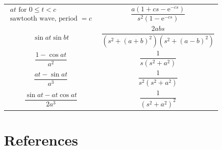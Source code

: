 \documentclass[
]{book}
\begin{document}
\begin{longtable}[]{@{}ll@{}}
\begin{minipage}[t]{0.42\columnwidth}
\[ \begin{align} at \text{ for } 0 \leq t \lt c \\ \text{sawtooth wave, period } = c \end{align}\]\strut
\end{minipage} & \begin{minipage}[t]{0.52\columnwidth}\raggedright
\[ \frac{a \left( 1 + cs - \mathrm{e}^{-cs} \right) }{s^2 \left( 1 - \mathrm{e}^{-cs} \right) } \]\strut
\end{minipage}\tabularnewline
\begin{minipage}[t]{0.42\columnwidth}\raggedright
\[\sin{at} \sin{bt} \]\strut
\end{minipage} & \begin{minipage}[t]{0.52\columnwidth}\raggedright
\[ \frac{2abs}{\left( s^2 + \left(a+b\right)^2\right) \left( s^2 + \left(a-b\right)^2\right)} \]\strut
\end{minipage}\tabularnewline
\begin{minipage}[t]{0.42\columnwidth}\raggedright
\[\frac{1 - \cos{at}}{a^2}  \]\strut
\end{minipage} & \begin{minipage}[t]{0.52\columnwidth}\raggedright
\[ \frac{1}{s \left( s^2 + a^2 \right) } \]\strut
\end{minipage}\tabularnewline
\begin{minipage}[t]{0.42\columnwidth}\raggedright
\[\frac{at - \sin{at}}{a^3}  \]\strut
\end{minipage} & \begin{minipage}[t]{0.52\columnwidth}\raggedright
\[ \frac{1}{s^2 \left( s^2 + a^2 \right) } \]\strut
\end{minipage}\tabularnewline
\begin{minipage}[t]{0.42\columnwidth}\raggedright
\[\frac{\sin{at} - at\cos{at}}{2a^3}  \]\strut
\end{minipage} & \begin{minipage}[t]{0.52\columnwidth}\raggedright
\[ \frac{1}{\left( s^2 + a^2 \right)^2 } \]\strut
\end{minipage}\tabularnewline
\bottomrule
\end{longtable}

\hypertarget{references}{%
\section{References}\label{references}}
\end{document}
